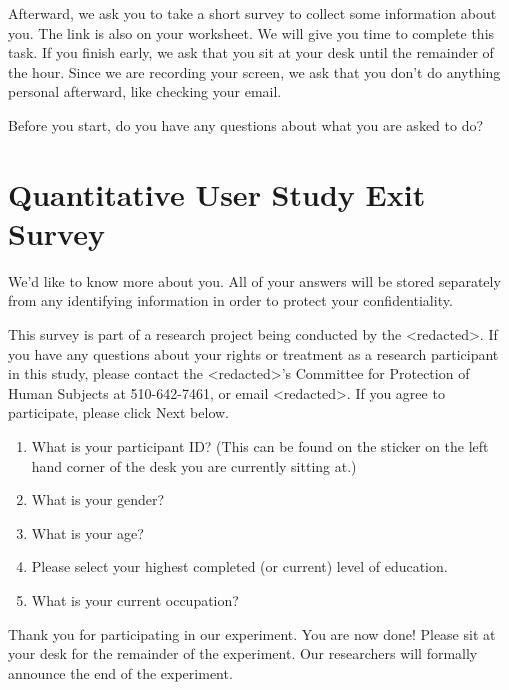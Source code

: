 \documentclass[USenglish,oneside,twocolumn]{article}
\begin{document}
Afterward, we ask you to take a short survey to collect some information about you. The link is also on your worksheet.
We will give you time to complete this task. If you finish early, we ask that you sit at your desk until the remainder of the hour. Since we are recording your screen, we ask that you don't do anything personal afterward, like checking your email.

Before you start, do you have any questions about what you are asked to do? 

\section{Quantitative User Study Exit Survey} 
\label{quantitative-exit-survey}
We'd like to know more about you.  All of your answers will be stored separately from any identifying information in order to protect your confidentiality.

This survey is part of a research project being conducted by the <redacted>. %
If you have any questions about your rights or treatment as a research participant in this study, please contact the <redacted>'s %
Committee for Protection of Human Subjects at 510-642-7461, or email 
<redacted>. %
If you agree to participate, please click Next below.\\

\begin{enumerate}
\item{What is your participant ID? (This can be found on the sticker on the left hand corner of the desk you are currently sitting at.)}
\item{What is your gender?}
\item{What is your age?}
\item{Please select your highest completed (or current) level of education}.
\item{What is your current occupation?}  
\end{enumerate}

Thank you for participating in our experiment. You are now done! Please sit at your desk for the remainder of the experiment. Our researchers will formally announce the end of the experiment. 
\end{document}
